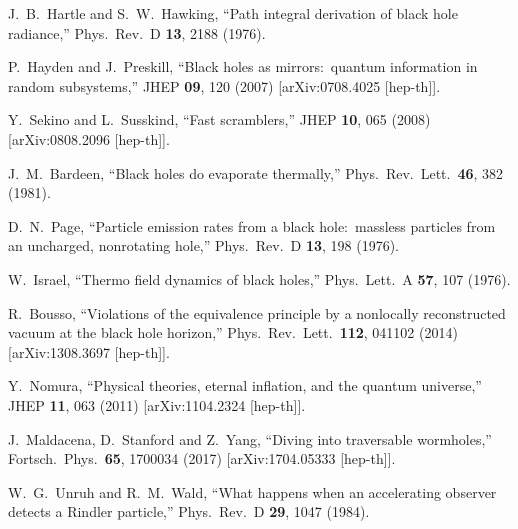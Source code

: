 \documentclass[12pt]{article}
\begin{document}
\begin{thebibliography}{99}
J.~B.~Hartle and S.~W.~Hawking,
``Path integral derivation of black hole radiance,''
Phys.\ Rev.\ D {\bf 13}, 2188 (1976).

P.~Hayden and J.~Preskill,
``Black holes as mirrors:\ quantum information in random subsystems,''
JHEP {\bf 09}, 120 (2007)
[arXiv:0708.4025 [hep-th]].

Y.~Sekino and L.~Susskind,
``Fast scramblers,''
JHEP {\bf 10}, 065 (2008)
[arXiv:0808.2096 [hep-th]].

J.~M.~Bardeen,
``Black holes do evaporate thermally,''
Phys.\ Rev.\ Lett.\ {\bf 46}, 382 (1981).

D.~N.~Page,
``Particle emission rates from a black hole:\ massless particles from an uncharged, nonrotating hole,''
Phys.\ Rev.\ D {\bf 13}, 198 (1976).

W.~Israel,
``Thermo field dynamics of black holes,''
Phys.\ Lett.\ A {\bf 57}, 107 (1976).

R.~Bousso,
``Violations of the equivalence principle by a nonlocally reconstructed vacuum at the black hole horizon,''
Phys.\ Rev.\ Lett.\ {\bf 112}, 041102 (2014)
[arXiv:1308.3697 [hep-th]].

Y.~Nomura,
``Physical theories, eternal inflation, and the quantum universe,''
JHEP {\bf 11}, 063 (2011)
[arXiv:1104.2324 [hep-th]].

J.~Maldacena, D.~Stanford and Z.~Yang,
``Diving into traversable wormholes,''
Fortsch.\ Phys.\ {\bf 65}, 1700034 (2017)
[arXiv:1704.05333 [hep-th]].

W.~G.~Unruh and R.~M.~Wald,
``What happens when an accelerating observer detects a Rindler particle,''
Phys.\ Rev.\ D {\bf 29}, 1047 (1984).


\end{thebibliography}
\end{document}
